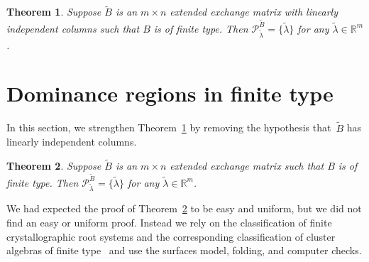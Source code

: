 \documentclass[10pt]{article}
\newtheorem{proposition}{Proposition}[section]
\newtheorem{theorem}[proposition]{Theorem}
\theoremstyle{definition}
\theoremstyle{remark}
\numberwithin{equation}{section}
\newcommand{\reals}{\mathbb R}
\newcommand{\set}[1]{{\lbrace #1 \rbrace}}
\newcommand{\0}{{\mathbf{0}}}
\newcommand{\Cone}{\mathrm{Cone}}
\newcommand{\g}{\mathbf{g}}
\newcommand{\tB}{{\widetilde{B}}}
\renewcommand{\P}{\mathcal{P}}
\begin{document}
\begin{theorem}\label{finite P point indep}  
Suppose $\tB$ is an $m\times n$ extended exchange matrix with linearly independent columns such that $B$ is of finite type.
  Then $\P^\tB_{\tilde\lambda}=\set{\tilde\lambda}$ for any $\tilde\lambda\in\reals^m$.
\end{theorem}

%



\section{Dominance regions in finite type}\label{rescue sec}
In this section, we strengthen Theorem~\ref{finite P point indep} by removing the hypothesis that~$\tB$ has linearly independent columns.

\begin{theorem}\label{finite P point}  
Suppose $\tB$ is an $m\times n$ extended exchange matrix such that $B$ is of finite type.
  Then $\P^\tB_{\tilde\lambda}=\set{\tilde\lambda}$ for any $\tilde\lambda\in\reals^m$.
\end{theorem}

We had expected the proof of Theorem~\ref{finite P point} to be easy and uniform, but we did not find an easy or uniform proof.  
Instead we rely on the classification of finite crystallographic root systems and the corresponding classification of cluster algebras of finite type~\cite{ca2} and use the surfaces model, folding, and computer checks.
\end{document}
